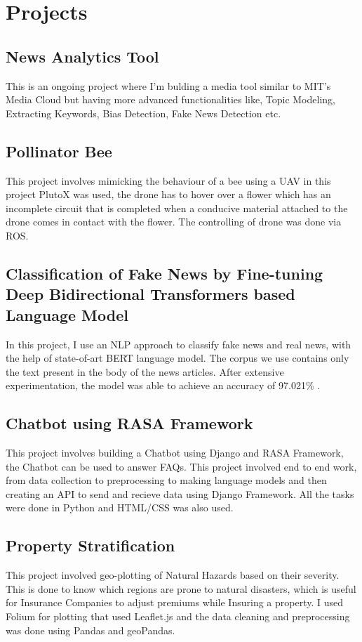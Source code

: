 \documentclass{article}
\begin{document}
\section{Projects}
\subsection{News Analytics Tool}
 This is an ongoing project where I'm bulding a media tool similar to MIT's Media Cloud but having more advanced functionalities like, Topic Modeling, Extracting Keywords, Bias Detection, Fake News Detection etc. 
\subsection{Pollinator Bee}
 This project involves mimicking the behaviour of a bee using a UAV in this project PlutoX was used, the drone has to hover over a flower which has an incomplete circuit that is completed when a conducive material attached to the drone comes in contact with the flower. The controlling of drone was done via ROS.
\subsection{Classification of Fake News by Fine-tuning Deep Bidirectional Transformers based Language Model}
  In this project, I use an NLP approach to classify fake news and real news, with the help of state-of-art BERT language model. The corpus we use contains only
the text present in the body of the news articles. After extensive experimentation, the model was
able to achieve an accuracy of 97.021\% .
\subsection{Chatbot using RASA Framework}
This project involves building a Chatbot using Django and RASA Framework, the Chatbot can be used to answer FAQs. This project involved end to end work, from data collection to preprocessing to making language models and then creating an API to send and recieve data using Django Framework. All the tasks were done in Python and HTML/CSS was also used.
\subsection{Property Stratification}
This project involved geo-plotting of Natural Hazards based on their severity. This is done to know which regions are prone to natural disasters, which is useful for Insurance Companies to adjust premiums while Insuring a property. I used Folium for plotting that used Leaflet.js and the data cleaning and preprocessing was done using Pandas and geoPandas. 
\end{document}
